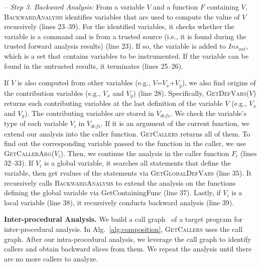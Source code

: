 \noindent
{\it -- Step 3. Backward Analysis:}
From a variable $V$ and a function $F$ containing $V$, \textsc{BackwardAnalysis} identifies variables that are used to compute the value of $V$ recursively (lines 23--39). For the identified variables, it checks whether the variable is a command and is from a trusted source (i.e., it is found during the trusted forward analysis results) (line 23). If so, the variable is added to $\textit{Ins}_\textit{out}$, which is a set that contains variables to be instrumented.
If the variable can be found in the untrusted results, it terminates (lines 25--26).

If $V$ is also computed from other variables (e.g., $V$=$V_x$+$V_y$), we also find origins of the contribution variables (e.g., $V_x$ and $V_y$) (line 28). Specifically, \textsc{GetDefVars}($V$) returns such contributing variables at the last definition of the variable $V$ (e.g., $V_x$ and $V_y$). The contributing variables are stored in $V_\textit{defs}$. 
%
We check the variable's type of each variable $V_i$ in $V_\textit{defs}$. If it is an argument of the current function, we extend our analysis into the caller function. \textsc{GetCallers} returns all of them. To find out the corresponding variable passed to the function in the caller, we use \textsc{GetCallerArg}($V_i$). Then, we continue the analysis in the caller function $F_i$ (lines 32--33). 
If $V_i$ is a global variable, it searches all statements that define the variable, then get rvalues of the statements via \textsc{GetGlobalDefVars} (line 35). It recursively calls \textsc{BackwardAnalysis} to extend the analysis on the functions defining the global variable via {GetContainingFunc} (line 37). 
%
Lastly, if $V_i$ is a local variable (line 38), it recursively conducts backward analysis (line 39).




\noindent
{\bf Inter-procedural Analysis.} 
We build a call graph~\cite{callgraph} of a target program for inter-procedural analysis. In Alg.~\ref{alg:composition}, \textsc{GetCallers} uses the call graph.
After our intra-procedural analysis, we leverage the call graph to identify callers and obtain backward slices from them. We repeat the analysis until there are no more callers to analyze.

